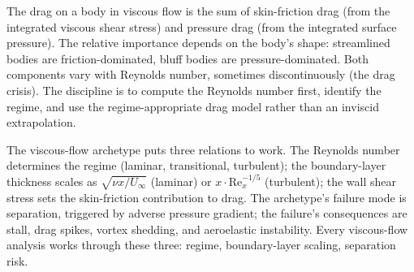 \begin{principle}
The drag on a body in viscous flow is the sum of skin-friction
drag (from the integrated viscous shear stress) and pressure drag
(from the integrated surface pressure). The relative importance
depends on the body's shape: streamlined bodies are
friction-dominated, bluff bodies are pressure-dominated. Both
components vary with Reynolds number, sometimes discontinuously
(the drag crisis). The discipline is to compute the Reynolds number
first, identify the regime, and use the regime-appropriate drag
model rather than an inviscid extrapolation.
\end{principle}

\begin{archetype}
The viscous-flow archetype puts three relations to work. The
Reynolds number determines the regime (laminar, transitional,
turbulent); the boundary-layer thickness scales as $\sqrt{\nu x/
U_\infty}$ (laminar) or $x \cdot \text{Re}_x^{-1/5}$ (turbulent);
the wall shear stress sets the skin-friction contribution to drag.
The archetype's failure mode is separation, triggered by adverse
pressure gradient; the failure's consequences are stall, drag
spikes, vortex shedding, and aeroelastic instability. Every
viscous-flow analysis works through these three: regime,
boundary-layer scaling, separation risk.
\end{archetype}

